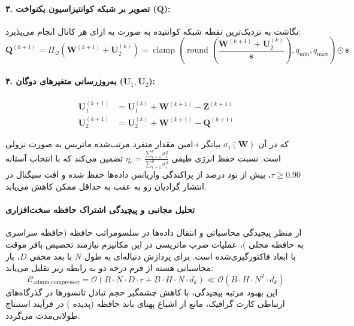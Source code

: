 \paragraph{۳. تصویر بر شبکه کوانتیزاسیون یکنواخت ($\mathbf{Q}$):}
نگاشت به نزدیک‌ترین نقطه شبکه کوانتیده به صورت به ازای هر کانال انجام می‌پذیرد:
\begin{equation}
\mathbf{Q}^{(k+1)} = \Pi_{\mathcal{Q}}\left(\mathbf{W}^{(k+1)} + \mathbf{U}_2^{(k)}\right) = \operatorname{clamp}\left(\operatorname{round}\left(\frac{\mathbf{W}^{(k+1)} + \mathbf{U}_2^{(k)}}{\mathbf{s}}\right), q_{\min}, q_{\max}\right) \odot \mathbf{s}
\end{equation}

\paragraph{۴. به‌روزرسانی متغیرهای دوگان ($\mathbf{U}_1, \mathbf{U}_2$):}
\begin{align}
\mathbf{U}_1^{(k+1)} &= \mathbf{U}_1^{(k)} + \mathbf{W}^{(k+1)} - \mathbf{Z}^{(k+1)} \\
\mathbf{U}_2^{(k+1)} &= \mathbf{U}_2^{(k)} + \mathbf{W}^{(k+1)} - \mathbf{Q}^{(k+1)}
\end{align}

که در آن $\sigma_i(\mathbf{W})$ بیانگر $i$-امین مقدار منفرد مرتب‌شده ماتریس به صورت نزولی است. نسبت حفظ انرژی طیفی $\eta_r = \frac{\sum_{i=1}^r \sigma_i^2}{\sum_{i=1}^{d} \sigma_i^2}$ تضمین می‌کند که با انتخاب آستانه $\tau \ge 0.90$، بیش از نود درصد از پراکندگی واریانس داده‌ها حفظ شده و افت سیگنال در انتشار گرادیان رو به عقب به حداقل ممکن کاهش می‌یابد.

\paragraph{تحلیل مجانبی و پیچیدگی اشتراک حافظه سخت‌افزاری}
از منظر پیچیدگی محاسباتی و انتقال داده‌ها در سلسومراتب حافظه (حافظه سراسری  به حافظه محلی )، عملیات ضرب ماتریسی در این مکانیزم نیازمند تخصیص بافر موقت با ابعاد فاکتورگیری‌شده است. برای پردازش دنباله‌ای به طول $N$ با بعد مخفی $D$، بار محاسباتی هسته از فرم درجه دو به رابطه زیر تقلیل می‌یابد:
\begin{equation}
\label{eq:complexity_admm_compressor}
\mathcal{C}_{\text{admm\_compressor}} = \mathcal{O}\left( B \cdot N \cdot D \cdot r + B \cdot H \cdot N \cdot d_k \right) \ll \mathcal{O}\left( B \cdot H \cdot N^2 \cdot d_k \right)
\end{equation}
این بهبود مرتبه پیچیدگی، با کاهش چشمگیر حجم تبادل تانسورها در گذرگاه‌های ارتباطی کارت گرافیک، مانع از اشباع پهنای باند حافظه (پدیده ) در فرآیند استنتاج طولانی‌مدت می‌گردد.
